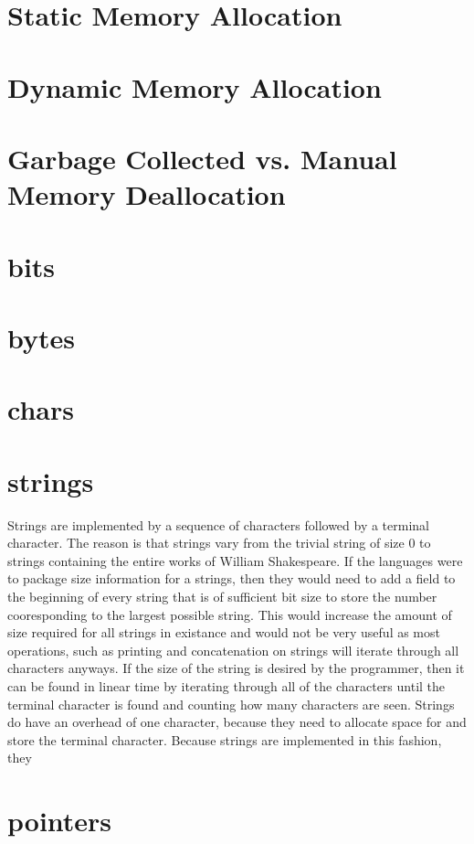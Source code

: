 \documentclass[12pt, letterpaper]{book}
\begin{document}
	\section{Static Memory Allocation} \label{static memory}
	\section{Dynamic Memory Allocation} \label{dynamic memory}
	\section[Memory Deallocation]{Garbage Collected vs. Manual Memory Deallocation}
	\section{bits}
	\section{bytes}
	\section{chars}
	\section{strings} \label{strings}
		Strings are implemented by a sequence of characters followed by a terminal character. The reason is that strings vary from the trivial string of size 0 to strings containing the entire works of William Shakespeare. If the languages were to package size information for a strings, then they would need to add a field to the beginning of every string that is of sufficient bit size to store the number cooresponding to the largest possible string. This would increase the amount of size required for all strings in existance and would not be very useful as most operations, such as printing and concatenation on strings will iterate through all characters anyways. If the size of the string is desired by the programmer, then it can be found in linear time by iterating through all of the characters until the terminal character is found and counting how many characters are seen. Strings do have an overhead of one character, because they need to allocate space for and store the terminal character. Because strings are implemented in this fashion, they 
	\section{pointers}
\end{document}
